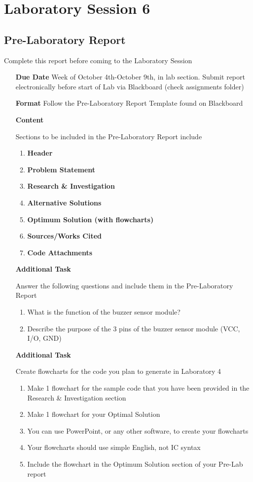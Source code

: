 \chapter{Laboratory Session 6}
\section{Pre-Laboratory Report}
	Complete this report before coming to the Laboratory Session
\begin{itemize}
	\item[\textbf{Due Date}]{Week of October 4th-October 9th, \the\year \space  in lab section. Submit report electronically before start of Lab via Blackboard (check assignments folder)}
	\item[\textbf{Format}]{Follow the Pre-Laboratory Report Template found on Blackboard}
	\item[\textbf{Content}]{Sections to be included in the Pre-Laboratory Report include
		\begin{enumerate}
			\item \textbf{Header}
			\item \textbf{Problem Statement}
			\item \textbf{Research \& Investigation}
			\item \textbf{Alternative Solutions}
			\item \textbf{Optimum Solution (with flowcharts)}
			\item \textbf{Sources/Works Cited}
			\item \textbf{Code Attachments}
		\end{enumerate}
		
	}
	
	\item[\textbf{Additional Task}]{Answer the following questions and include them in the Pre-Laboratory Report
		\begin{enumerate}[label=\alph*.]
			\item What is the function of the buzzer sensor module? 
			\item Describe the purpose of the 3 pins of the buzzer sensor module (VCC, I/O, GND) 
		\end{enumerate}	
	}

	\item[\textbf{Additional Task}]{Create flowcharts for the code you plan to generate in Laboratory 4
		\begin{enumerate}[label=\alph*.]
			\item Make 1 flowchart for the sample code that you have been provided in the Research \& Investigation section 
			\item Make 1 flowchart for your Optimal Solution
			\item You can use PowerPoint, or any other software, to create your flowcharts
			\item Your flowcharts should use simple English, not IC syntax
			\item Include the flowchart in the Optimum Solution section of your Pre-Lab report
		\end{enumerate}
		
	}
\end{itemize}
